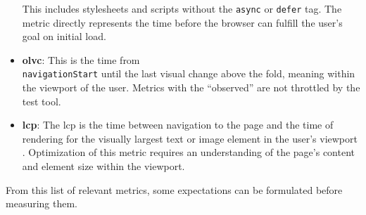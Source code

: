 \documentclass[a4paper, 12pt]{article}
\begin{document}
\begin{itemize}
  This includes stylesheets and scripts without the \verb|async| or \verb|defer| tag.
  The metric directly represents the time before the browser can fulfill the user's goal on initial load.
  \item \textbf{\acrfull{olvc}}: This is the time from \\
  \verb|navigationStart| until the last visual change above the fold, meaning within the viewport of the user.
  Metrics with the \enquote{observed} are not throttled by the test tool.
  \item \textbf{\acrfull{lcp}}: The \acrshort{lcp} is the time between navigation to the page and the time of rendering for the visually largest text or image element in the user's viewport \citep{lcpDocumentation}.
  Optimization of this metric requires an understanding of the page's content and element size within the viewport.
\end{itemize}

From this list of relevant metrics, some expectations can be formulated before measuring them.
\end{document}
